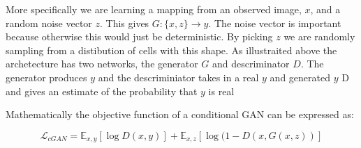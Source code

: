 \documentclass[ms,electronic,oneside,twosidetoc,letterpaper,chaptercenter,parttop]{byumsphd}
\begin{document}
More specifically we are learning a mapping from an observed image, $x$, and a random noise vector $z$. This 
gives $G: \{ x, z \} \rightarrow y$. The noise vector is important because otherwise this would just be deterministic.
By picking $z$ we are randomly sampling from a distibution of cells with this shape. 
As illustraited above the archetecture has two networks, the generator $G$ and descriminator $D$. The generator
produces $y$ and the descriminiator takes in a real $y$ and generated $y$ D and gives an estimate of the 
probability that $y$ is real

Mathematically the objective function of a conditional GAN can be expressed as:

$$\mathcal{L}_{cGAN} = \mathbb{E}_{x,y}[\log D(x,y)] + \mathbb{E}_{x,z}[\log (1 - D(x, G(x, z))]$$


\begin{figure}[H]
  \centering

   \quad
   \quad
   \quad
   \quad


\end{figure}
\end{document}
